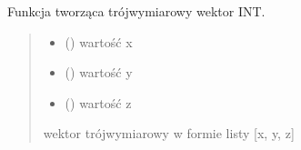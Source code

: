 \documentclass[a4paper,10pt,openany,english]{sphinxmanual}
\begin{document}

\begin{fulllineitems}
\label{\detokenize{js/js-functions:vector3i}}
\pysigstartsignatures
\pysiglinewithargsret
{}
{\sphinxparamcomma {}\sphinxparamcomma {}}
{}
\pysigstopsignatures
\sphinxAtStartPar
Funkcja tworząca trójwymiarowy wektor INT.
\begin{quote}\begin{description}
\begin{itemize}
\item {} 
\sphinxAtStartPar
{} () \textendash{} wartość x

\item {} 
\sphinxAtStartPar
{} () \textendash{} wartość y

\item {} 
\sphinxAtStartPar
{} () \textendash{} wartość z

\end{itemize}

\sphinxAtStartPar
wektor trójwymiarowy w formie listy {[}x, y, z{]}

\end{description}\end{quote}

\end{fulllineitems}

\end{document}
